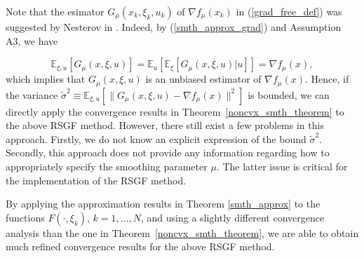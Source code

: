 \documentclass[final]{siamltex}
\newcommand{\beq}{\begin{equation}}
\newcommand{\eeq}{\end{equation}}
\def\eqnok#1{(\ref{#1})}
\def\vgap{\vspace*{.1in}}
\newcommand{\bbe}{\mathbb{E}}
\begin{document}
\vgap

Note that the esimator $G_{\mu}(x_k, \xi_k, u_k)$ of $\nabla f_\mu(x_k)$ in \eqnok{grad_free_def}
was suggested by Nesterov in \cite{Nest11-1}. Indeed, by \eqnok{smth_approx_grad} and Assumption A3, we have

\beq \label{def_ex_G_mu}
\bbe_{\xi, u}[G_{\mu}(x, \xi, u)] = \bbe_u \left[ \bbe_{\xi}[G_{\mu}(x, \xi, u)|u] \right] = \nabla f_{\mu}(x),
\eeq
which implies that $G_{\mu}(x, \xi, u)$ is an unbiased estimator of $\nabla f_{\mu}(x)$.
Hence, if the variance $\tilde \sigma^2 \equiv \bbe_{\xi, u}[\|G_{\mu}(x, \xi, u)-\nabla f_{\mu}(x)\|^2]$
is bounded, we can directly apply the convergence results in Theorem~\ref{noncvx_smth_theorem}
to the above RSGF method. However, there still exist a few problems in this approach. Firstly, we
do not know an explicit expression of the bound $\tilde \sigma^2$.
Secondly, this approach does not provide any information
regarding how to appropriately specify the smoothing parameter $\mu$.
The latter issue is critical for the implementation of the
RSGF method.


By applying the approximation results in Theorem \ref{smth_approx} to
the functions $F(\cdot, \xi_k)$, $k = 1, \ldots, N$, and using a slightly
different convergence analysis than the one in Theorem~\ref{noncvx_smth_theorem},
we are able to obtain much refined convergence results for the above RSGF method.
\end{document}
